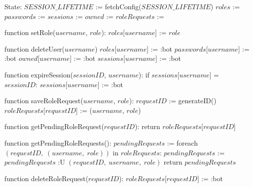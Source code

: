 State:
    $SESSION\_LIFETIME$ := fetchConfig($SESSION\_LIFETIME$)
    $roles$ := {}
    $passwords$ := {}
    $sessions$ := {}
    $owned$ := {}
    $roleRequests$ := {}

function setRole($username$, $role$):
    $roles$[$username$] := $role$

function deleteUser($username$)
    $roles$[$username$] := :bot
    $passwords$[$username$] := :bot
    $owned$[$username$] := :bot
    $sessions$[$username$] := :bot

function expireSession($sessionID$, $username$):
    if $sessions$[$username$] = $sessionID$:
        $sessions$[$username$] := :bot

function saveRoleRequest($username$, $role$):
    $requestID$ := generateID()
    $roleRequests$[$requestID$] := ($username$, $role$)

function getPendingRoleRequest($requestID$):
    return $roleRequests$[$requestID$]

function getPendingRoleRequests():
    $pendingRequests$ := {}
    foreach $(requestID, \; (username, \; role))$ in $roleRequests$:
        $pendingRequests$ := $pendingRequests$ :U { $(requestID, \; username, \; role)$ }
    return $pendingRequests$

function deleteRoleRequest($requestID$):
    $roleRequests$[$requestID$] := :bot